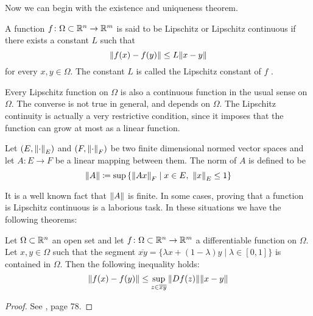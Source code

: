 Now we can begin with the existence and uniqueness theorem. 
\begin{definition*}
	A function $f \colon \Omega \subset \mathbb{R}^n \rightarrow \mathbb{R}^m$ is said to
	be Lipschitz or Lipschitz continuous if there exists a constant $L$ such
	that
	\begin{equation*}
		\norm{f(x) - f(y)} \leq L \norm{x - y}
	\end{equation*}
	for every $x, y \in \Omega$. The constant $L$ is called the
	Lipschitz constant of $f$ \cite{salsa2009pde}.
\end{definition*}

Every Lipschitz function on $\Omega$ is also a continuous function in the usual
sense on $\Omega$. The converse is not true in general, and depends on $\Omega$.
The Lipschitz continuity is actually a very restrictive condition, since it
imposes that the function can grow at most as a linear function. 

\begin{definition*}
	Let $(E, \norm{\cdot}_E)$ and $(F, \norm{\cdot}_F)$ be two finite
	dimensional normed vector spaces and let $A \colon E \rightarrow F$ be a
	linear mapping between them. The norm of $A$ is defined to be
	\begin{equation*}
		\norm{A} \coloneqq 
		\sup{\left\{ \norm{A x}_F \mid x \in E, \ \norm{x}_E \leq 1 \right\}}
	\end{equation*}
\end{definition*}

\noindent
It is a well known fact that $\norm{A}$ is finite. In some cases, proving that a
function is Lipschitz continuous is a laborious task. In these situations we
have the following theorems:

\begin{theorem}
	\label{teo:corollary_mean_value_theorem} Let $\Omega \subset \mathbb{R}^n$ an
	open set and let $f \colon \Omega \subset \mathbb{R}^n \to \mathbb{R}^m$ a
	differentiable function on $\Omega$. Let $x, y \in \Omega$ such
	that the segment $\overline{xy} = \{ \lambda x + (1 -
	\lambda) y \mid \lambda \in [0, 1] \}$ is contained in $\Omega$. Then
	the following inequality holds:
	\begin{equation*}
		\norm{f(x) - f(y)} \leq \sup_{z \in 
		\overline{xy}} \norm{D f(z)} \norm{x - y}
	\end{equation*}
\end{theorem}
\begin{proof}
	See \cite{mazon2008calculo}, page 78.
\end{proof}

